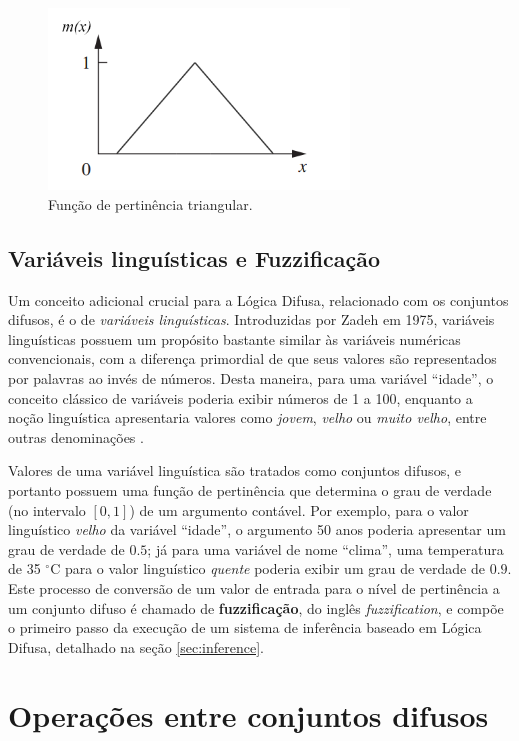 \documentclass[12pt]{article}
\begin{document}
\begin{figure}[ht]
    \centering
    \includegraphics[width=8cm]{membership.png}
    \caption{Função de pertinência triangular.}
    \label{fig:membership}
\end{figure}

\subsection{Variáveis linguísticas e Fuzzificação} \label{sec:linguisticvars}

Um conceito adicional crucial para a Lógica Difusa, relacionado com os conjuntos difusos, é o de \textit{variáveis linguísticas}. Introduzidas por Zadeh em 1975, variáveis linguísticas possuem um propósito bastante similar às variáveis numéricas convencionais, com a diferença primordial de que seus valores são representados por palavras ao invés de números. Desta maneira, para uma variável ``idade'', o conceito clássico de variáveis poderia exibir números de 1 a 100, enquanto a noção linguística apresentaria valores como \textit{jovem}, \textit{velho} ou \textit{muito velho}, entre outras denominações \cite{Zadeh1975}.

Valores de uma variável linguística são tratados como conjuntos difusos, e portanto possuem uma função de pertinência que determina o grau de verdade (no intervalo $[0, 1]$) de um argumento contável. Por exemplo, para o valor linguístico \textit{velho} da variável ``idade'', o argumento 50 anos poderia apresentar um grau de verdade de $0.5$; já para uma variável de nome ``clima'', uma temperatura de 35 $^{\circ}$C para o valor linguístico \textit{quente} poderia exibir um grau de verdade de $0.9$. Este processo de conversão de um valor de entrada para o nível de pertinência a um conjunto difuso é chamado de \textbf{fuzzificação}, do inglês \textit{fuzzification}, e compõe o primeiro passo da execução de um sistema de inferência baseado em Lógica Difusa, detalhado na seção \ref{sec:inference}.

\section{Operações entre conjuntos difusos} \label{sec:operations}
\end{document}
